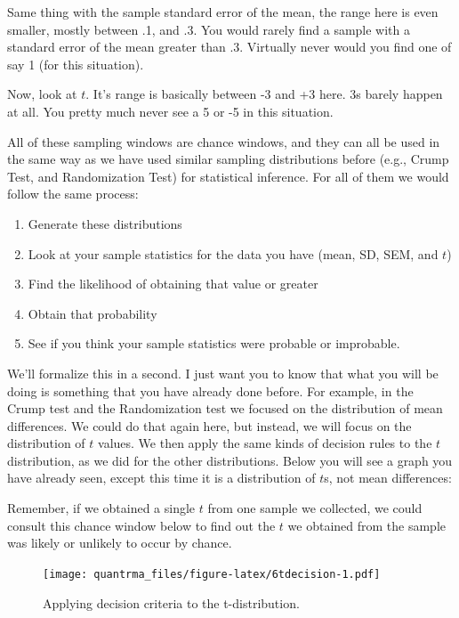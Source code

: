 \documentclass[
]{book}
\providecommand{\tightlist}{%
  \setlength{\itemsep}{0pt}\setlength{\parskip}{0pt}}
\begin{document}
Same thing with the sample standard error of the mean, the range here is even smaller, mostly between .1, and .3. You would rarely find a sample with a standard error of the mean greater than .3. Virtually never would you find one of say 1 (for this situation).

Now, look at \(t\). It's range is basically between -3 and +3 here. 3s barely happen at all. You pretty much never see a 5 or -5 in this situation.

All of these sampling windows are chance windows, and they can all be used in the same way as we have used similar sampling distributions before (e.g., Crump Test, and Randomization Test) for statistical inference. For all of them we would follow the same process:

\begin{enumerate}
\def\labelenumi{\arabic{enumi}.}
\tightlist
\item
  Generate these distributions
\item
  Look at your sample statistics for the data you have (mean, SD, SEM, and \(t\))
\item
  Find the likelihood of obtaining that value or greater
\item
  Obtain that probability
\item
  See if you think your sample statistics were probable or improbable.
\end{enumerate}

We'll formalize this in a second. I just want you to know that what you will be doing is something that you have already done before. For example, in the Crump test and the Randomization test we focused on the distribution of mean differences. We could do that again here, but instead, we will focus on the distribution of \(t\) values. We then apply the same kinds of decision rules to the \(t\) distribution, as we did for the other distributions. Below you will see a graph you have already seen, except this time it is a distribution of \(t\)s, not mean differences:

Remember, if we obtained a single \(t\) from one sample we collected, we could consult this chance window below to find out the \(t\) we obtained from the sample was likely or unlikely to occur by chance.

\begin{figure}
\centering
\texttt{[image: quantrma\_files/figure-latex/6tdecision-1.pdf]}
\caption{\label{fig:6tdecision}Applying decision criteria to the t-distribution.}
\end{figure}
\end{document}
